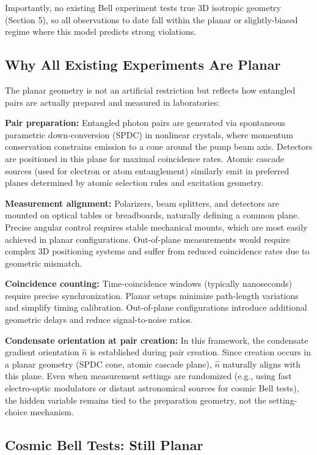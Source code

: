 \documentclass[11pt,a4paper]{article}
\theoremstyle{definition}
\theoremstyle{remark}
\begin{document}
Importantly, no existing Bell experiment tests true 3D isotropic geometry
(Section 5), so all observations to date fall within the planar or
slightly-biased regime where this model predicts strong violations.

\subsection{Why All Existing Experiments Are Planar}

The planar geometry is not an artificial restriction but reflects how entangled pairs are actually prepared and measured in laboratories:

\textbf{Pair preparation:} Entangled photon pairs are generated via spontaneous parametric down-conversion (SPDC) in nonlinear crystals, where momentum conservation constrains emission to a cone around the pump beam axis. Detectors are positioned in this plane for maximal coincidence rates. Atomic cascade sources (used for electron or atom entanglement) similarly emit in preferred planes determined by atomic selection rules and excitation geometry.

\textbf{Measurement alignment:} Polarizers, beam splitters, and detectors are mounted on optical tables or breadboards, naturally defining a common plane. Precise angular control requires stable mechanical mounts, which are most easily achieved in planar configurations. Out-of-plane measurements would require complex 3D positioning systems and suffer from reduced coincidence rates due to geometric mismatch.

\textbf{Coincidence counting:} Time-coincidence windows (typically nanoseconds) require precise synchronization. Planar setups minimize path-length variations and simplify timing calibration. Out-of-plane configurations introduce additional geometric delays and reduce signal-to-noise ratios.

\textbf{Condensate orientation at pair creation:} In this framework, the condensate gradient orientation $\hat{n}$ is established during pair creation. Since creation occurs in a planar geometry (SPDC cone, atomic cascade plane), $\hat{n}$ naturally aligns with this plane. Even when measurement settings are randomized (e.g., using fast electro-optic modulators or distant astronomical sources for cosmic Bell tests), the hidden variable remains tied to the preparation geometry, not the setting-choice mechanism.

\subsection{Cosmic Bell Tests: Still Planar}
\end{document}
